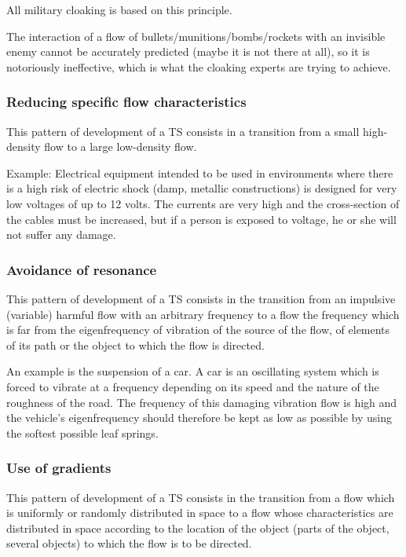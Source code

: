 \documentclass[a4paper,11pt]{article}
\begin{document}
All military cloaking is based on this principle.

The interaction of a flow of bullets/munitions/bombs/rockets with an invisible
enemy cannot be accurately predicted (maybe it is not there at all), so it is
notoriously ineffective, which is what the cloaking experts are trying to
achieve.

\subsubsection{Reducing specific flow characteristics}

This pattern of development of a TS consists in a transition from a small
high-density flow to a large low-density flow.

Example: Electrical equipment intended to be used in environments where there
is a high risk of electric shock (damp, metallic constructions) is designed
for very low voltages of up to 12 volts. The currents are very high and the
cross-section of the cables must be increased, but if a person is exposed to
voltage, he or she will not suffer any damage.

\subsubsection{Avoidance of resonance}

This pattern of development of a TS consists in the transition from an
impulsive (variable) harmful flow with an arbitrary frequency to a flow the
frequency which is far from the eigenfrequency of vibration of the source of
the flow, of elements of its path or the object to which the flow is directed.

An example is the suspension of a car. A car is an oscillating system which is
forced to vibrate at a frequency depending on its speed and the nature of the
roughness of the road. The frequency of this damaging vibration flow is high
and the vehicle's eigenfrequency should therefore be kept as low as possible
by using the softest possible leaf springs.

\subsubsection{Use of gradients}

This pattern of development of a TS consists in the transition from a flow
which is uniformly or randomly distributed in space to a flow whose
characteristics are distributed in space according to the location of the
object (parts of the object, several objects) to which the flow is to be
directed.
\end{document}
